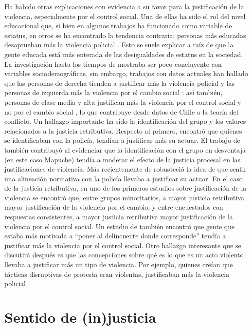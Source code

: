 \documentclass[12pt,twoside]{templates/facsothesis}
\begin{document}
Ha habido otras explicaciones con evidencia a su favor para la justificación de la violencia, especialmente por el control social. Una de ellas ha sido el rol del nivel educacional que, si bien en algunos trabajos ha funcionado como variable de estatus, en otros se ha encontrado la tendencia contraria: personas más educadas desaprueban más la violencia policial \citep{Gamson1970, Thomas1977}. Esto se suele explicar a raíz de que la gente educada está más enterada de las desigualdades de estatus en la sociedad. La investigación hasta los tiempos de \citet{Thompson2004} mostraba ser poco concluyente con variables sociodemográficas, sin embargo, trabajos con datos actuales han hallado que las personas de derecha tienden a justificar más la violencia policial y las personas de izquierda más la violencia por el cambio social \citep{Puga2016, Gerber2017}; así también, personas de clase media y alta justifican más la violencia por el control social y no por el cambio social \citep{Gerber2017}, lo que contribuye desde datos de Chile a la teoría del conflicto. Un hallazgo importante ha sido la identificación del grupo y los valores relacionados a la justicia retributiva. Respecto al primero, \citet{Blumenthal1972} encontró que quienes se identificaban con la policía, tendían a justificar más su actuar. El trabajo de \citet{Gerber2017b} también contribuyó al evidenciar que la identificación con el grupo en desventaja (en este caso Mapuche) tendía a moderar el efecto de la justicia procesal en las justificaciones de violencia. Más recientemente de \citet{Bradford2017} robusteció la idea de que sentir una alineación normativa con la policía llevaba a justificar su actuar. En el caso de la justicia retributiva, en uno de los primeros estudios sobre justificación de la violencia se encontró que, entre grupos minoritarios, a mayor justicia retributiva mayor justificación de la violencia por el cambio, y entre encuestados con respuestas consistentes, a mayor justicia retributiva mayor justificación de la violencia por el control social. Un estudio de \citet{Puga2016} también encontró que gente que estaba más motivada a ``poner al delincuente donde corresponde'' tendía a justificar más la violencia por el control social. Otro hallazgo interesante que se discutirá después es que las concepciones sobre qué es lo que es un acto violento llevaba a justificar más un tipo de violencia. Por ejemplo, quienes creían que tácticas disruptivas de protesta eran violentas, justificaban más la violencia policial \citep{Blumenthal1972}.

\hypertarget{sentido-de-injusticia}{%
\section{Sentido de (in)justicia}\label{sentido-de-injusticia}}
\end{document}

